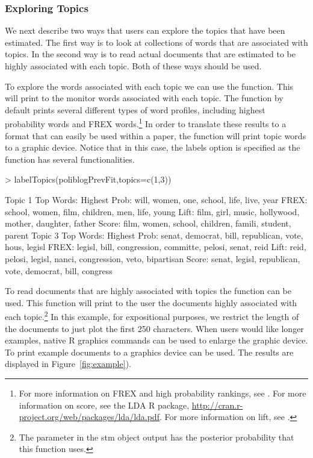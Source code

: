 \documentclass[nojss]{jss}
\begin{document}
\subsubsection{Exploring Topics}

We next describe two ways that users can explore the topics that have been estimated. The first way is to look at collections of words that are associated with topics. In the second way is to read actual documents that are estimated to be highly associated with each topic. Both of these ways should be used.

To explore the words associated with each topic we can use the  function. This will print to the monitor words associated with each topic. The function by default prints several different types of word profiles, including highest probability words and FREX words.\footnote{For more information on FREX and high probability rankings, see \citet{nips2013,STMEdo,ajps,TextComparative}. For more information on score, see the LDA R package, \url{http://cran.r-project.org/web/packages/lda/lda.pdf}. For more information on lift, see \citet{taddy2012multinomial}.}  In order to translate these results to a format that can easily be used within a paper, the  function will print topic words to a graphic device. Notice that in this case, the labels option is specified as the  function has several functionalities.

\begin{Schunk}
\begin{Sinput}
> labelTopics(poliblogPrevFit,topics=c(1,3))
\end{Sinput}
\begin{Soutput}
Topic 1 Top Words:
 	 Highest Prob: will, women, one, school, life, live, year 
 	 FREX: school, women, film, children, men, life, young 
 	 Lift: film, girl, music, hollywood, mother, daughter, father 
 	 Score: film, women, school, children, famili, student, parent 
Topic 3 Top Words:
 	 Highest Prob: senat, democrat, bill, republican, vote, hous, legisl 
 	 FREX: legisl, bill, congression, committe, pelosi, senat, reid 
 	 Lift: reid, pelosi, legisl, nanci, congression, veto, bipartisan 
 	 Score: senat, legisl, republican, vote, democrat, bill, congress 
\end{Soutput}
\end{Schunk}

To read documents that are highly associated with topics the  function can be used. This function will print to the user the documents highly associated with each topic.\footnote{The  parameter in the stm object output has the posterior probability that this function uses.} In this example, for expositional purposes, we restrict the length of the documents to just plot the first 250 characters. When users would like longer examples, native R graphics commands can be used to enlarge the graphic device. To print example documents to a graphics device  can be used. The results are displayed in Figure~\ref{fig:example}).
\end{document}
